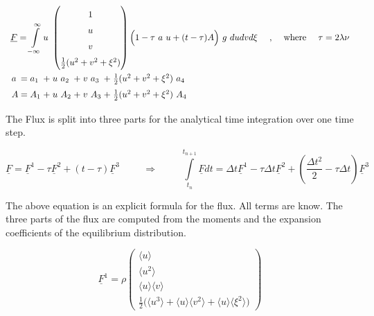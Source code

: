 \documentclass[
	pdftex,             %
	12pt,				%
	a4paper,		   	%
	english,				%
	oneside,			%
]{article}
\newcommand{\mom}[1]{\langle #1 \rangle}
\newcommand{\uu}[1]{\underline{#1}}
\begin{document}
\begin{equation}
\begin{array}{l}
\uu{F} = 
\displaystyle \int \limits_{-\infty}^{\infty}
u~
\begin{pmatrix}
	1 \\ u \\ v \\ \frac{1}{2} (u^2 + v^2 + \xi^2)
\end{pmatrix}
\Big(
	1 - \tau~a~u + (t-\tau)A
\Big)
~g~ du dv d\xi
\textnormal{~~~~,~~~~where~~~~}
\tau = 2 \lambda \nu
\\
\arraycolsep=1.4pt\def\arraystretch{1.5}
\begin{array}{lclclclcl}
a &=& a_1 &+& u~a_2 &+& v~a_3 &+& \tfrac{1}{2} (u^2 + v^2 + \xi^2)~a_4
\\
A &=& A_1 &+& u~A_2 &+& v~A_3 &+& \tfrac{1}{2} (u^2 + v^2 + \xi^2)~A_4
\end{array}
\end{array}
\end{equation}

The Flux is split into three parts for the analytical time integration over one time step. 

\begin{equation}
\uu{F} = \uu{F}^1 - \tau \uu{F}^2 + (t - \tau) \uu{F}^3
\hspace{1cm} \Rightarrow \hspace{1cm}
\int \limits_{t_n}^{t_{n+1}} \uu{F} dt 
= \Delta t\uu{F}^1 
- \tau \Delta t \uu{F}^2 
+ \left( \dfrac{\Delta t^2}{2} - \tau \Delta t \right) \uu{F}^3
\end{equation}

The above equation is an explicit formula for the flux. All terms are know. The three parts of the flux are computed from the moments and the expansion coefficients of the equilibrium distribution.

\begin{equation}
\uu{F}^1 =
\rho
\begin{pmatrix}
\mom{u} \\ 
\mom{u^2} \\ 
\mom{u}\mom{v} \\ 
\frac{1}{2} \Big(\mom{u^3} + \mom{u}\mom{v^2} + \mom{u}\mom{\xi^2} \Big)
\end{pmatrix}
\end{equation}

\end{document}
